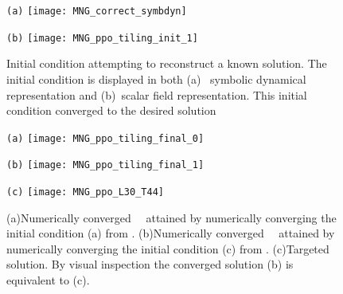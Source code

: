 \begin{figure} %
\centering
\begin{minipage}[height=.3\textheight]{.3\textwidth}
\centering \small{\texttt{(a)}}
\texttt{[image: MNG\_correct\_symbdyn]}
\end{minipage}
\begin{minipage}[height=.35\textheight]{.35\textwidth}
\centering \small{\texttt{(b)}}
\texttt{[image: MNG\_ppo\_tiling\_init\_1]}
\end{minipage}
\caption{ \label{fig:MNGsymbolsconverge}
Initial condition attempting to reconstruct a known solution.
The initial condition is displayed in both (a) \spt\ symbolic dynamical representation
and (b)\spt\ scalar field representation. This initial condition converged
to the desired solution
}
\end{figure}


\begin{figure} %
\centering
\begin{minipage}[height=.25\textheight]{.25\textwidth}
\centering \small{\texttt{(a)}}
\texttt{[image: MNG\_ppo\_tiling\_final\_0]}
\end{minipage}
\begin{minipage}[height=.25\textheight]{.25\textwidth}
\centering \small{\texttt{(b)}}
\texttt{[image: MNG\_ppo\_tiling\_final\_1]}
\end{minipage}
\begin{minipage}[height=.25\textheight]{.25\textwidth}
\centering \small{\texttt{(c)}}
\texttt{[image: MNG\_ppo\_L30\_T44]}
\end{minipage}
\caption{\label{fig:MNGsymbolsconverged}
(a)Numerically converged \spt\ \twot\ attained by numerically converging the initial condition (a) from .
(b)Numerically converged \spt\ \twot\ attained by numerically converging the initial condition (c) from .
(c)Targeted solution. By visual inspection the converged solution (b) is equivalent to (c).
}
\end{figure}


